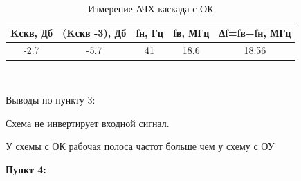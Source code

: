 \documentclass[a4paper,14pt]{extarticle}
\begin{document}
    \begin{table}[ht]
        \begin{center}
            \caption{Измерение АЧХ каскада с ОК}
            \begin{tabular}{ |c|c|c|c|c| }
                \hline
                Kскв, Дб & (Kскв -3), Дб&fн, Гц & fв, МГц & ∆f=fв−fн, МГц \\
                \hline 
                -2.7 & -5.7 & 41 & 18.6 & 18.56\\
                \hline
            \end{tabular}\\
        \end{center}
    \end{table}
    Выводы по пункту 3:

    Схема не инвертирует входной сигнал.

    У схемы с ОК рабочая полоса частот больше чем у схему с ОУ

    \newpage
    \textbf{Пункт 4:}
\end{document}
